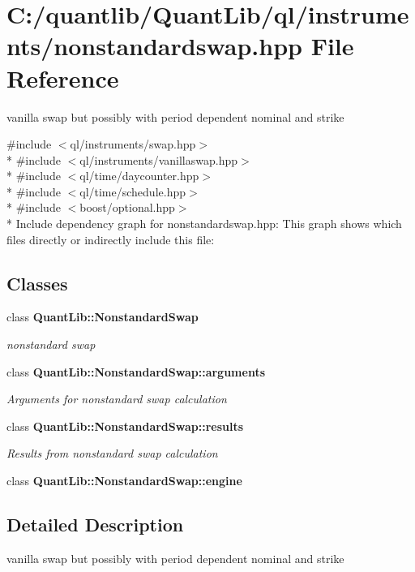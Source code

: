 \section{C\+:/quantlib/\+Quant\+Lib/ql/instruments/nonstandardswap.hpp File Reference}
\label{nonstandardswap_8hpp}


vanilla swap but possibly with period dependent nominal and strike  


{\ttfamily \#include $<$ql/instruments/swap.\+hpp$>$}\\*
{\ttfamily \#include $<$ql/instruments/vanillaswap.\+hpp$>$}\\*
{\ttfamily \#include $<$ql/time/daycounter.\+hpp$>$}\\*
{\ttfamily \#include $<$ql/time/schedule.\+hpp$>$}\\*
{\ttfamily \#include $<$boost/optional.\+hpp$>$}\\*
Include dependency graph for nonstandardswap.\+hpp\+:
This graph shows which files directly or indirectly include this file\+:
\subsection*{Classes}
\begin{DoxyCompactItemize}
\item 
class {\bf Quant\+Lib\+::\+Nonstandard\+Swap}
\begin{DoxyCompactList}\small\item\em nonstandard swap \end{DoxyCompactList}\item 
class {\bf Quant\+Lib\+::\+Nonstandard\+Swap\+::arguments}
\begin{DoxyCompactList}\small\item\em Arguments for nonstandard swap calculation \end{DoxyCompactList}\item 
class {\bf Quant\+Lib\+::\+Nonstandard\+Swap\+::results}
\begin{DoxyCompactList}\small\item\em Results from nonstandard swap calculation \end{DoxyCompactList}\item 
class {\bf Quant\+Lib\+::\+Nonstandard\+Swap\+::engine}
\end{DoxyCompactItemize}


\subsection{Detailed Description}
vanilla swap but possibly with period dependent nominal and strike 

